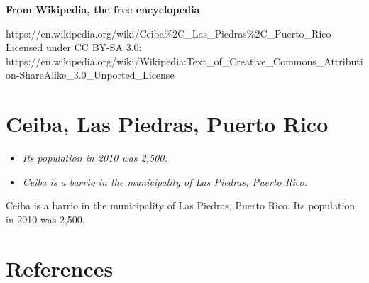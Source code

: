 \textbf{From Wikipedia, the free encyclopedia}

https://en.wikipedia.org/wiki/Ceiba\%2C\_Las\_Piedras\%2C\_Puerto\_Rico\\
Licensed under CC BY-SA 3.0:\\
https://en.wikipedia.org/wiki/Wikipedia:Text\_of\_Creative\_Commons\_Attribution-ShareAlike\_3.0\_Unported\_License

\section{Ceiba, Las Piedras, Puerto
Rico}\label{ceiba-las-piedras-puerto-rico}

\begin{itemize}
\item
  \emph{Its population in 2010 was 2,500.}
\item
  \emph{Ceiba is a barrio in the municipality of Las Piedras, Puerto
  Rico.}
\end{itemize}

Ceiba is a barrio in the municipality of Las Piedras, Puerto Rico. Its
population in 2010 was 2,500.

\section{References}\label{references}
